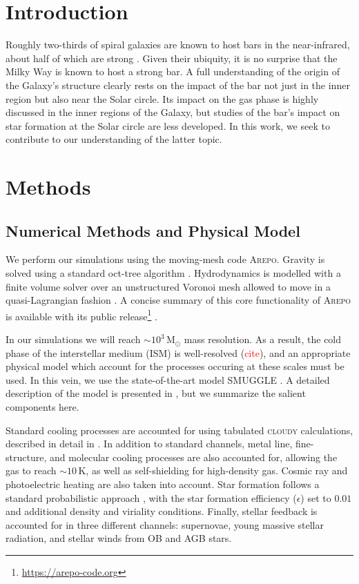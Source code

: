 \documentclass[a4paper,fleqn,usenatbib]{mnras}
\newcommand{\Msun}{\ensuremath{\text{M}_{\odot}}}
\newcommand{\arepo}{\textsc{Arepo}}
\newcommand{\smuggle}{\textsc{SMUGGLE}}
\begin{document}


\section{Introduction}
Roughly two-thirds of spiral galaxies are known to host bars in the
near-infrared, about half of which are strong
\citep[e.g.][]{2000AJ....119..536E}. Given their ubiquity, it is no surprise
that the Milky Way is known to host a strong bar. A full understanding of the
origin of the Galaxy's structure clearly rests on the impact of the bar not
just in the inner region but also near the Solar circle. Its impact on the gas
phase is highly discussed in the inner regions of the Galaxy, but studies of
the bar's impact on star formation at the Solar circle are less developed. In
this work, we seek to contribute to our understanding of the latter topic.



\section{Methods}
\subsection{Numerical Methods and Physical Model}
We perform our simulations using the moving-mesh code \arepo{}. Gravity is
solved using a standard oct-tree algorithm \citep{1986Natur.324..446B}.
Hydrodynamics is modelled with a finite volume solver over an unstructured
Voronoi mesh allowed to move in a quasi-Lagrangian fashion
\citep{2010MNRAS.401..791S, 2016MNRAS.455.1134P}. A concise summary of this
core functionality of \arepo{} is available with its public
release\footnote{\url{https://arepo-code.org}} \citep{2019arXiv190904667W}.

In our simulations we will reach $\sim10^3\,\Msun$ mass resolution. As a
result, the cold phase of the interstellar medium (ISM) is well-resolved
(\textcolor{red}{cite}), and an appropriate physical model which account for
the processes occuring at these scales must be used. In this vein, we use the
state-of-the-art model \smuggle{} \citep{2019MNRAS.489.4233M}. A detailed
description of the model is presented in \citet{2019MNRAS.489.4233M}, but we
summarize the salient components here.

Standard cooling processes are accounted for using tabulated \textsc{cloudy}
calculations, described in detail in \citet{2013MNRAS.436.3031V}. In addition
to standard channels, metal line, fine-structure, and molecular cooling
processes are also accounted for, allowing the gas to reach
$\sim10\,\text{K}$, as well as self-shielding for high-density gas. Cosmic ray
and photoelectric heating are also taken into account. Star formation follows
a standard probabilistic approach \citep{2003MNRAS.339..289S}, with the star
formation efficiency ($\epsilon$) set to $0.01$ and additional density and
viriality conditions. Finally, stellar feedback is accounted for in three
different channels: supernovae, young massive stellar radiation, and stellar
winds from OB and AGB stars.
\end{document}
